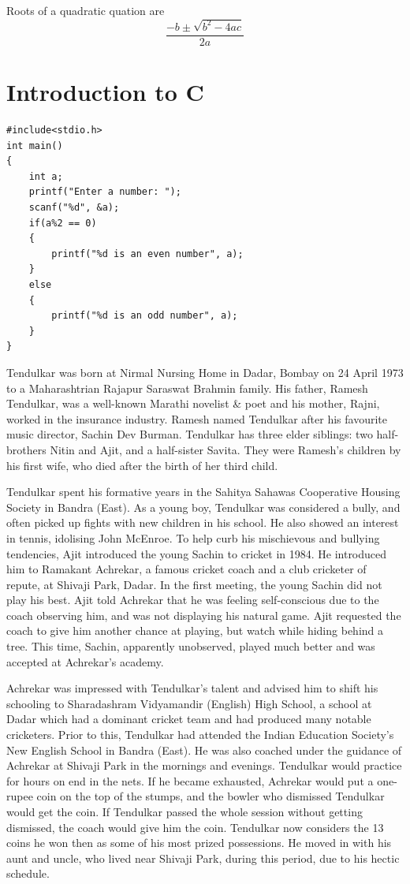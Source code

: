 \documentclass{report}
\begin{document}
Roots of a quadratic quation are
\begin{equation}
	\frac{-b \pm \sqrt{b^2-4ac}}{2a}
\end{equation}
	
	
\chapter{Introduction to C}
\begin{lstlisting}[caption={Program to check odd or even}]
#include<stdio.h>
int main()
{
	int a;
	printf("Enter a number: ");
	scanf("%d", &a);
	if(a%2 == 0)
	{
		printf("%d is an even number", a);
	}
	else
	{
		printf("%d is an odd number", a);
	}
}
\end{lstlisting}


Tendulkar was born at Nirmal Nursing Home in Dadar, Bombay on 24 April 1973 to a Maharashtrian Rajapur Saraswat Brahmin family. His father, Ramesh Tendulkar, was a well-known Marathi novelist \& poet and his mother, Rajni, worked in the insurance industry. Ramesh named Tendulkar after his favourite music director, Sachin Dev Burman. Tendulkar has three elder siblings: two half-brothers Nitin and Ajit, and a half-sister Savita. They were Ramesh's children by his first wife, who died after the birth of her third child.

Tendulkar spent his formative years in the Sahitya Sahawas Cooperative Housing Society in Bandra (East). As a young boy, Tendulkar was considered a bully, and often picked up fights with new children in his school. He also showed an interest in tennis, idolising John McEnroe. To help curb his mischievous and bullying tendencies, Ajit introduced the young Sachin to cricket in 1984. He introduced him to Ramakant Achrekar, a famous cricket coach and a club cricketer of repute, at Shivaji Park, Dadar. In the first meeting, the young Sachin did not play his best. Ajit told Achrekar that he was feeling self-conscious due to the coach observing him, and was not displaying his natural game. Ajit requested the coach to give him another chance at playing, but watch while hiding behind a tree. This time, Sachin, apparently unobserved, played much better and was accepted at Achrekar's academy.

Achrekar was impressed with Tendulkar's talent and advised him to shift his schooling to Sharadashram Vidyamandir (English) High School, a school at Dadar which had a dominant cricket team and had produced many notable cricketers. Prior to this, Tendulkar had attended the Indian Education Society's New English School in Bandra (East). He was also coached under the guidance of Achrekar at Shivaji Park in the mornings and evenings. Tendulkar would practice for hours on end in the nets. If he became exhausted, Achrekar would put a one-rupee coin on the top of the stumps, and the bowler who dismissed Tendulkar would get the coin. If Tendulkar passed the whole session without getting dismissed, the coach would give him the coin. Tendulkar now considers the 13 coins he won then as some of his most prized possessions. He moved in with his aunt and uncle, who lived near Shivaji Park, during this period, due to his hectic schedule.
\end{document}
